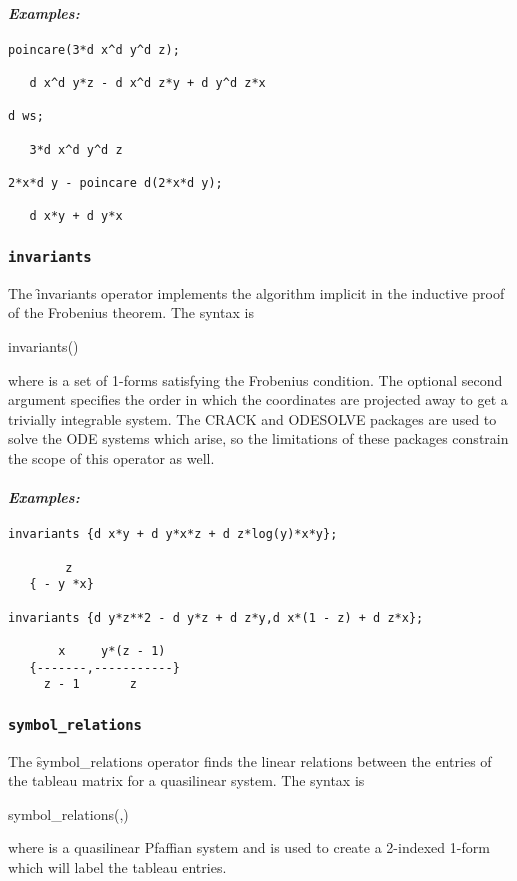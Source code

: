 \paragraph{\it Examples:}
\begin{verbatim}
poincare(3*d x^d y^d z);

   d x^d y*z - d x^d z*y + d y^d z*x 

d ws;

   3*d x^d y^d z

2*x*d y - poincare d(2*x*d y);

   d x*y + d y*x
\end{verbatim}


\subsubsection{\tt invariants}
\label{invariants}

The \f{invariants} operator implements the algorithm implicit in the
inductive proof of the Frobenius theorem. The syntax is
\begin{edssyntax}
	invariants()
\end{edssyntax}
where  is a set of 1-forms satisfying the Frobenius condition.
The optional second argument specifies the order in which the coordinates
are projected away to get a trivially integrable system.  The CRACK and
ODESOLVE packages are used to solve the ODE systems which arise, so the
limitations of these packages constrain the scope of this operator as well.

\paragraph{\it Examples:}
\begin{verbatim}
invariants {d x*y + d y*x*z + d z*log(y)*x*y};

        z
   { - y *x}

invariants {d y*z**2 - d y*z + d z*y,d x*(1 - z) + d z*x};

       x     y*(z - 1)
   {-------,-----------}
     z - 1       z
\end{verbatim}


\subsubsection{\tt symbol\_relations}
\label{symbol_relations}

The \f{symbol\_relations} operator finds the linear relations between the
entries of the tableau matrix for a quasilinear system. The syntax is
\begin{syntax}
	symbol\_relations(,)
\end{syntax}
where  is a quasilinear Pfaffian system and  is
used to create a 2-indexed 1-form which will label the tableau entries.

